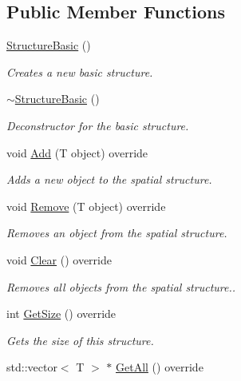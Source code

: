 \subsection*{Public Member Functions}
\begin{DoxyCompactItemize}
\item 
\hyperlink{class_flounder_1_1_structure_basic_a52e87f980887f306c682561684273992}{Structure\+Basic} ()
\begin{DoxyCompactList}\small\item\em Creates a new basic structure. \end{DoxyCompactList}\item 
\hyperlink{class_flounder_1_1_structure_basic_a974c2610c8a5cca7502e4e30f2618557}{$\sim$\+Structure\+Basic} ()
\begin{DoxyCompactList}\small\item\em Deconstructor for the basic structure. \end{DoxyCompactList}\item 
void \hyperlink{class_flounder_1_1_structure_basic_a9af4ffc54290689b65b22261118591fe}{Add} (T object) override
\begin{DoxyCompactList}\small\item\em Adds a new object to the spatial structure. \end{DoxyCompactList}\item 
void \hyperlink{class_flounder_1_1_structure_basic_a850d10cc6ca577bd59698d9b63e83bf4}{Remove} (T object) override
\begin{DoxyCompactList}\small\item\em Removes an object from the spatial structure. \end{DoxyCompactList}\item 
void \hyperlink{class_flounder_1_1_structure_basic_ae5ca6b77a74f2277ea27d1d6b9e4ad64}{Clear} () override
\begin{DoxyCompactList}\small\item\em Removes all objects from the spatial structure.. \end{DoxyCompactList}\item 
int \hyperlink{class_flounder_1_1_structure_basic_a4e7c03380511e986ba879f0c953b3993}{Get\+Size} () override
\begin{DoxyCompactList}\small\item\em Gets the size of this structure. \end{DoxyCompactList}\item 
std\+::vector$<$ T $>$ $\ast$ \hyperlink{class_flounder_1_1_structure_basic_ab4d0ecf6a9efeb993af50fa77b4b27d1}{Get\+All} () override

\end{DoxyCompactItemize}
